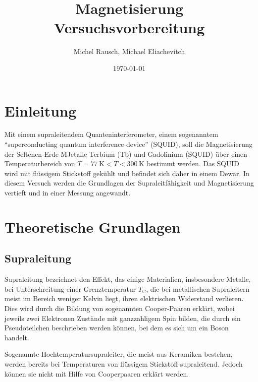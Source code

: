 \documentclass[a4paper,ngerman]{scrartcl}
\title{Magnetisierung\\Versuchsvorbereitung}
\date{\today}
\author{Michel Rausch, Michael Eliachevitch}
\begin{document}
\maketitle
\tableofcontents
\newpage

\section{Einleitung}


Mit einem supraleitendem Quanteninterferometer, einem sogenanntem
"`superconducting quantum interference device"' (SQUID), soll
die Magnetisierung der Seltenen-Erde-MJetalle Terbium (Tb) und
Gadolinium (SQUID) über einen Temperaturbereich von $T=
\SI{77}{\kelvin} < T < \SI{300}{\kelvin}$ bestimmt werden.
Das SQUID wird mit flüssigem Stickstoff gekühlt und befindet sich
daher in einem Dewar. In diesem Versuch werden die Grundlagen der
Supraleitfähigkeit und Magnetisierung vertieft und in einer Messung
angewandt.


\section{Theoretische Grundlagen}

\subsection{Supraleitung}

Supraleitung bezeichnet den Effekt, das einige Materialien,
insbesondere Metalle, bei Unterschreitung einer Grenztemperatur
$T_{\mathrm{C}}$, die bei metallischen Supraleitern meist im Bereich
weniger Kelvin liegt, ihren elektrischen Widerstand verlieren.
Dies wird durch die Bildung von sogenannten Cooper-Paaren erklärt,
wobei jeweils zwei Elektronen Zustände mit ganzzahligem
Spin bilden, die durch ein Pseudoteilchen beschrieben werden können,
bei dem es sich um ein Boson handelt.


Sogenannte Hochtemperatursupraleiter, die meist aus Keramiken
bestehen, werden bereits bei Temperaturen von flüssigem Stickstoff
supraleitend.
Jedoch können sie nicht mit Hilfe von Cooperpaaren erklärt werden.  
\end{document}
